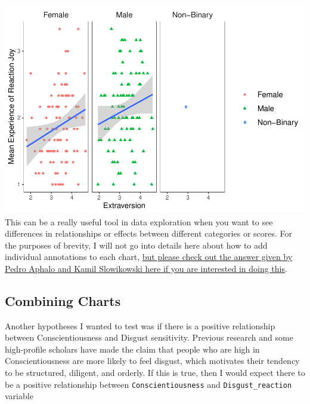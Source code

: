 \documentclass[
]{book}
\begin{document}
\includegraphics{rintro_demo_files/figure-latex/unnamed-chunk-318-1.pdf}
This can be a really useful tool in data exploration when you want to see differences in relationships or effects between different categories or scores. For the purposes of brevity, I will not go into details here about how to add individual annotations to each chart, \href{https://stackoverflow.com/questions/11889625/annotating-text-on-individual-facet-in-ggplot2}{but please check out the answer given by Pedro Aphalo and Kamil Slowikowski here if you are interested in doing this}.

\hypertarget{combining-charts}{%
\subsection{Combining Charts}\label{combining-charts}}

Another hypotheses I wanted to test was if there is a positive relationship between Conscientiousness and Disgust sensitivity. Previous research and some high-profile scholars have made the claim that people who are high in Conscientiousness are more likely to feel disgust, which motivates their tendency to be structured, diligent, and orderly. If this is true, then I would expect there to be a positive relationship between \texttt{Conscientiousness} and \texttt{Disgust\_reaction} variable
\end{document}

